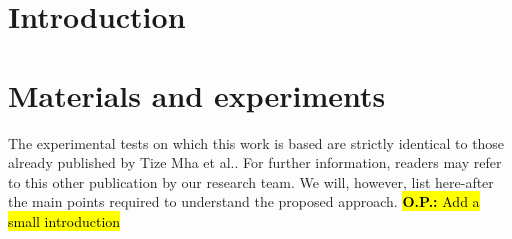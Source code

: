 \documentclass[metals,article,submit,pdftex,moreauthors]{Definitions/mdpi}
\makeatletter
\DeclareRobustCommand{\eal}{et al.\@\xspace}
\DeclareRobustCommand{\OP}[1]{\begingroup\sethlcolor{VWyellow}\textcolor{red}{\hl{\textbf{O.P.:} #1}}\endgroup}
\makeatother
\begin{document}
\section{Introduction\label{sec:Introduction}}

\section{Materials and experiments\label{sec:MaterialsExperiments}}
The experimental tests on which this work is based are strictly identical to those already published by Tize Mha \eal \cite{TizeMha-2023}.
For further information, readers may refer to this other publication by our research team.
We will, however, list here-after the main points required to understand the proposed approach. \OP{Add a small introduction}

\end{document}
